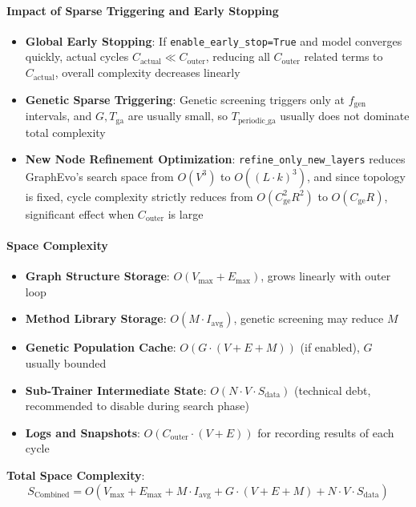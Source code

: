 \paragraph{Impact of Sparse Triggering and Early Stopping}
\begin{itemize}
    \item \textbf{Global Early Stopping}: If \texttt{enable\_early\_stop=True} and model converges quickly, actual cycles $C_{\mathrm{actual}} \ll C_{\mathrm{outer}}$, reducing all $C_{\mathrm{outer}}$ related terms to $C_{\mathrm{actual}}$, overall complexity decreases linearly
    \item \textbf{Genetic Sparse Triggering}: Genetic screening triggers only at $f_{\mathrm{gen}}$ intervals, and $G, T_{\mathrm{ga}}$ are usually small, so $T_{\mathrm{periodic\_ga}}$ usually does not dominate total complexity
    \item \textbf{New Node Refinement Optimization}: \texttt{refine\_only\_new\_layers} reduces GraphEvo's search space from $O(V^3)$ to $O((L \cdot k)^3)$, and since topology is fixed, cycle complexity strictly reduces from $O(C_{\mathrm{ge}}^2 R^2)$ to $O(C_{\mathrm{ge}} R)$, significant effect when $C_{\mathrm{outer}}$ is large
\end{itemize}

\paragraph{Space Complexity}
\begin{itemize}
    \item \textbf{Graph Structure Storage}: $O(V_{\max} + E_{\max})$, grows linearly with outer loop
    \item \textbf{Method Library Storage}: $O(M \cdot I_{\mathrm{avg}})$, genetic screening may reduce $M$
    \item \textbf{Genetic Population Cache}: $O(G \cdot (V + E + M))$ (if enabled), $G$ usually bounded
    \item \textbf{Sub-Trainer Intermediate State}: $O(N \cdot V \cdot S_{\mathrm{data}})$ (technical debt, recommended to disable during search phase)
    \item \textbf{Logs and Snapshots}: $O(C_{\mathrm{outer}} \cdot (V + E))$ for recording results of each cycle
\end{itemize}

\textbf{Total Space Complexity}:
\begin{equation}
    S_{\mathrm{Combined}} = O(V_{\max} + E_{\max} + M \cdot I_{\mathrm{avg}} + G \cdot (V + E + M) + N \cdot V \cdot S_{\mathrm{data}})
\end{equation}

